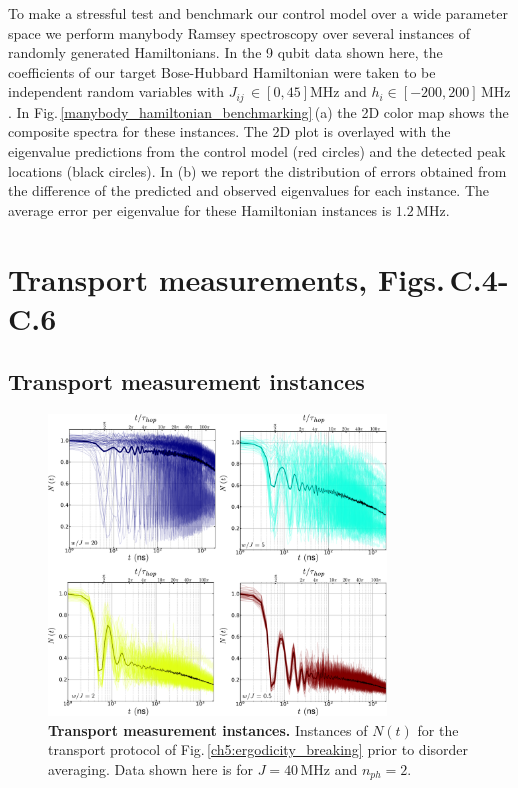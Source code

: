     To make a stressful test and benchmark our control model over a wide parameter space we perform manybody Ramsey spectroscopy over several instances of randomly generated Hamiltonians.
    In the 9 qubit data shown here, the coefficients of our target Bose-Hubbard Hamiltonian were taken to be independent random variables with $J_{ij}\, \in[0, 45] \text{MHz}$ and $h_{i} \in[-200, 200] \, \text{MHz}$.
    In Fig.\,\ref{manybody_hamiltonian_benchmarking}\,(a) the 2D color map shows the composite spectra for these instances.  The 2D plot is overlayed with the eigenvalue predictions from the control model (red circles) and the detected peak locations (black circles).
    In (b) we report the distribution of errors obtained from the difference of the predicted and observed eigenvalues for each instance.
    The average error per eigenvalue for these Hamiltonian instances is $1.2 \, \text{MHz}$.

\section{Transport measurements, Figs.\,C.4-C.6}
\subsection{Transport measurement instances}
\begin{figure}[h!]
    \centering
    \includegraphics[width=0.8\textwidth, keepaspectratio]{./PDF/fs4_190625_150p.pdf}
    \caption{\textbf{Transport measurement instances.}
    Instances of $N \left( t \right)$ for the transport protocol of Fig.\,\ref{ch5:ergodicity_breaking} prior to disorder averaging.  Data shown here is for $J=40 \, \text{MHz}$ and $n_{ph}=2$.
    }
    \label{transport_instances}
    \end{figure}

